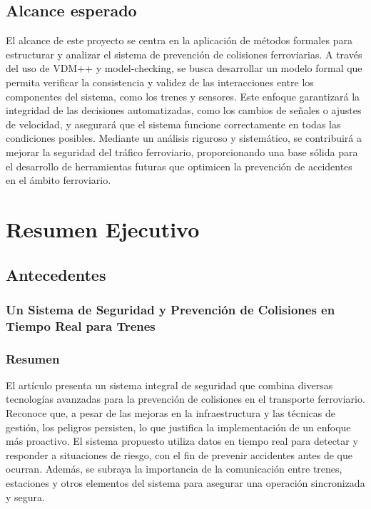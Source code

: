 \documentclass[journal]{IEEEtran}
\begin{document}
\subsection{Alcance esperado}
El alcance de este proyecto se centra en la aplicación de métodos formales para estructurar y analizar el sistema de prevención de colisiones ferroviarias. A través del uso de VDM++ y model-checking, se busca desarrollar un modelo formal que permita verificar la consistencia y validez de las interacciones entre los componentes del sistema, como los trenes y sensores. Este enfoque garantizará la integridad de las decisiones automatizadas, como los cambios de señales o ajustes de velocidad, y asegurará que el sistema funcione correctamente en todas las condiciones posibles. Mediante un análisis riguroso y sistemático, se contribuirá a mejorar la seguridad del tráfico ferroviario, proporcionando una base sólida para el desarrollo de herramientas futuras que optimicen la prevención de accidentes en el ámbito ferroviario.

\section{Resumen Ejecutivo}

\subsection{Antecedentes}
\subsubsection{Un Sistema de Seguridad y Prevención de Colisiones en Tiempo Real para Trenes}
\subsubsection*{Resumen}  
El artículo presenta un sistema integral de seguridad que combina diversas tecnologías avanzadas para la prevención de colisiones en el transporte ferroviario. Reconoce que, a pesar de las mejoras en la infraestructura y las técnicas de gestión, los peligros persisten, lo que justifica la implementación de un enfoque más proactivo. El sistema propuesto utiliza datos en tiempo real para detectar y responder a situaciones de riesgo, con el fin de prevenir accidentes antes de que ocurran. Además, se subraya la importancia de la comunicación entre trenes, estaciones y otros elementos del sistema para asegurar una operación sincronizada y segura.
\end{document}
